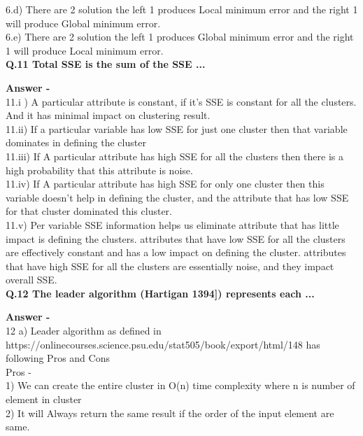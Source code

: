 \documentclass[5pt]{article}
\begin{document}
6.d) There are 2 solution the left 1 produces Local minimum error and the right 1 will produce Global minimum error. \\

6.e) There are 2 solution the left 1 produces Global minimum error and the right 1 will produce Local minimum error. \\

\textbf{Q.11  Total SSE is the sum of the SSE ... }

\setlength{\parskip}{1.2em}
\setlength{\parindent}{0em}

\textbf{Answer -} \\
11.i ) A particular attribute is constant, if it's SSE is constant for all the clusters. And it has minimal impact on clustering result. \\

 11.ii) If a particular variable has low SSE for just one cluster then that variable dominates in defining the cluster \\
 
 11.iii) If A particular attribute has high SSE for all the clusters then there is a high probability that this attribute is noise. \\
 
 11.iv)  If A particular attribute has high SSE for only one cluster then this variable doesn't help in defining the cluster, and the attribute that has low SSE for that cluster dominated this cluster. \\
 
 11.v) Per variable SSE information helps us eliminate attribute that has little impact is defining the clusters. attributes that have low SSE for all the clusters are effectively constant and has a low impact on defining the cluster.
  attributes that have high SSE for all the clusters are essentially noise, and they impact overall SSE.  \\

\textbf{Q.12  The leader algorithm (Hartigan 1394]) represents each ... }

\setlength{\parskip}{1.2em}
\setlength{\parindent}{0em}

\textbf{Answer -} \\
 12 a) Leader algorithm as defined in https://onlinecourses.science.psu.edu/stat505/book/export/html/148 has following Pros and Cons  \\

Pros - \\

1) We can create the entire cluster in O(n) time complexity where n is number of element in cluster \\
2) It will Always return the same result if the order of the input element are same.\\
\end{document}
